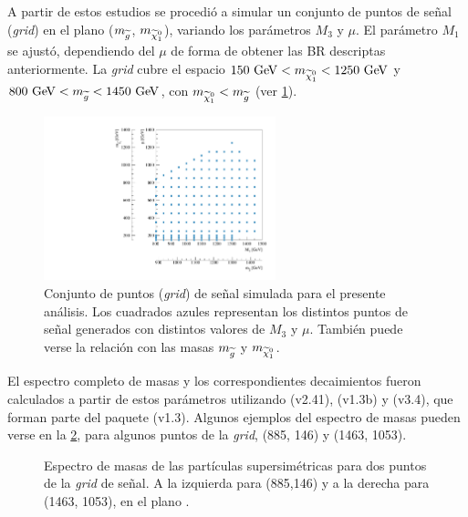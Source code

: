 A partir de estos estudios se procedió a simular un conjunto de puntos de señal
(\emph{grid}) en el plano ($m_{\widetilde{g}}$, $m_{\ninoone}$), variando los parámetros
$M_3$ y $\mu$. El parámetro $M_1$ se ajustó, dependiendo del $\mu$ de forma de
obtener las BR descriptas anteriormente. La \emph{grid} cubre el espacio $150\gev <
m_{\ninoone} < 1250 \gev$ y $800\gev < m_{\gluino} < 1450 \gev$, con
$m_{\ninoone} < m_{\gluino}$ (ver \cref{fig:gridpoints}).


\begin{figure}[!htb]
  \centering
  \includegraphics[width=0.6\textwidth]{figures/run1_grid}
  \caption{Conjunto de puntos (\emph{grid}) de señal simulada para el presente
    análisis. Los cuadrados azules representan los distintos puntos de señal
    generados con distintos valores de $M_3$ y $\mu$. También
    puede verse la relación con las masas $m_{\widetilde{g}}$ y $m_{\ninoone}$.}
  \label{fig:gridpoints}
\end{figure}


El espectro completo de masas y los correspondientes decaimientos fueron
calculados a partir de estos parámetros utilizando {\suspect}
(v2.41)\cite{Djouadi2007426}, {\sdecay} (v1.3b)\cite{Muhlleitner:2004mka} y
{\hdecay} (v3.4)\cite{Djouadi:1997yw}, que forman parte del paquete {\susyhit}
(v1.3)\cite{Djouadi:2006bz}. Algunos ejemplos del espectro de masas pueden verse
en la \cref{fig:mass_spectra}, para algunos puntos de la \emph{grid}, (885, 146) y (1463, 1053).

\begin{figure}[!htb]
  \centering

  \resizebox{0.495\textwidth}{!}{}
  \resizebox{0.495\textwidth}{!}{}

   \caption{Espectro de masas de las partículas supersimétricas para dos puntos de la \emph{grid} de señal.
     A la izquierda para (885,146) y a la derecha para (1463, 1053), en el plano \mgmn.}
   \label{fig:mass_spectra}
\end{figure}


